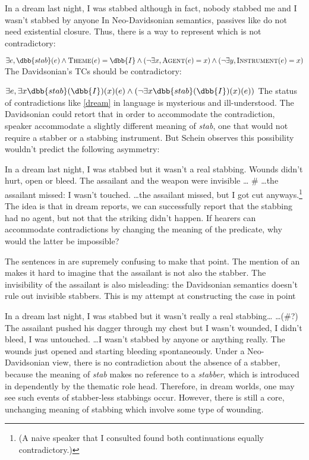 \ex\label{dream}
In a dream last night, I was stabbed although in fact, nobody stabbed me and I wasn't stabbed by anyone
\xe
%
In Neo-Davidsonian semantics, passives like  do not need existential closure. Thus, there is a way to represent \clastx which is not contradictory:

\ex
$\exists e, \dbb{stab}(e) \wedge \textsc{Theme}(e) = \dbb{I} \wedge\left(\neg\exists x, \textsc{Agent}(e) = x\right) \wedge \left(\neg\exists y, \textsc{Instrument}(e) = x\right)$
\xe
%
The Davidsonian's TCs should be contradictory:

\ex
$\exists e, \exists x\dbb{stab}(\dbb{I})(x)(e) \wedge 
 \left(\neg\exists x\dbb{stab}(\dbb{I})(x)(e)\right)$
\xe
%
The status of contradictions like \cref{dream} in language is mysterious and ill-understood. The Davidsonian could retort that in order to accommodate the contradiction, speaker accommodate a slightly different meaning of \emph{stab}, one that would not require a stabber or a stabbing instrument. But Schein observes this possibility wouldn't predict the following asymmetry:

\pex
In a dream last night, I was stabbed but it wasn't a real stabbing.
Wounds didn't hurt, open or bleed.
The assailant and the weapon were invisible \ldots
\a\ljudge\# \ldots the assailant missed: I wasn't touched.
\a \ldots the assailant missed, but I got cut anyways.\footnote{
(A naive speaker that I consulted found both continuations equally contradictory.)
}
\xe
%
The idea is that in dream reports, we can successfully report that the stabbing had no agent, but not that the striking didn't happen. 
If hearers can accommodate contradictions by changing the meaning of the predicate, why would the latter be impossible?

The sentences in \clastx are supremely confusing to make that point. The mention of an  makes it hard to imagine that the assailant is not also the stabber. The invisibility of the assailant is also misleading: the Davidsonian semantics doesn't rule out invisible stabbers. This is my attempt at constructing the case in point

\pex
In a dream last night, I was stabbed but it wasn't really a real stabbing\ldots
\a 
\ldots(\#?) The assailant pushed his dagger through my chest but I wasn't wounded, I didn't bleed, I was untouched.
\a 
\ldots I wasn't stabbed by anyone or anything really. The wounds just opened and starting bleeding spontaneously.
\xe
%
Under a Neo-Davidsonian view, there is no contradiction about the absence of a stabber, because the meaning of \emph{stab} makes no reference to 	a \emph{stabber}, which is introduced in dependently by the thematic role head. Therefore, in dream worlds, one may see such events of stabber-less stabbings occur. However, there is still a core, unchanging meaning of stabbing which involve some type of wounding.




